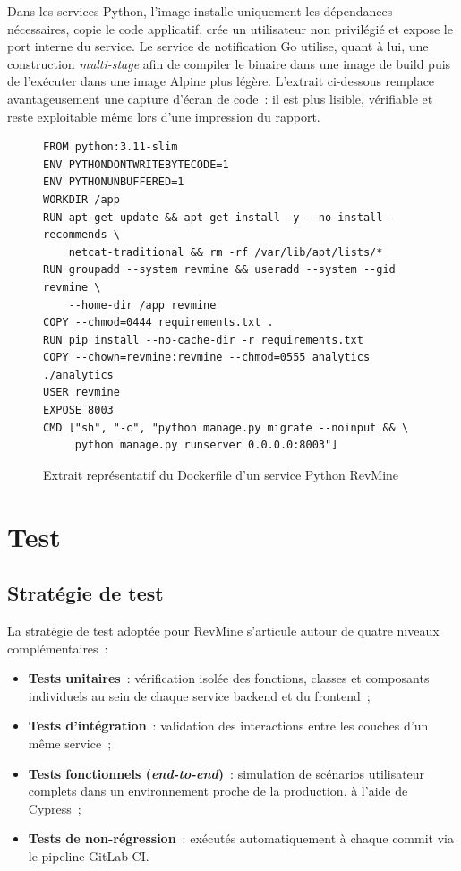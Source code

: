 Dans les services Python, l'image installe uniquement les dépendances nécessaires, copie le code
applicatif, crée un utilisateur non privilégié et expose le port interne du service. Le service de
notification Go utilise, quant à lui, une construction \textit{multi-stage} afin de compiler le
binaire dans une image de build puis de l'exécuter dans une image Alpine plus légère. L'extrait
ci-dessous remplace avantageusement une capture d'écran de code~: il est plus lisible, vérifiable
et reste exploitable même lors d'une impression du rapport.

\begin{figure}[H]
\centering
\begin{minipage}{0.95\textwidth}
\begin{verbatim}
FROM python:3.11-slim
ENV PYTHONDONTWRITEBYTECODE=1
ENV PYTHONUNBUFFERED=1
WORKDIR /app
RUN apt-get update && apt-get install -y --no-install-recommends \
    netcat-traditional && rm -rf /var/lib/apt/lists/*
RUN groupadd --system revmine && useradd --system --gid revmine \
    --home-dir /app revmine
COPY --chmod=0444 requirements.txt .
RUN pip install --no-cache-dir -r requirements.txt
COPY --chown=revmine:revmine --chmod=0555 analytics ./analytics
USER revmine
EXPOSE 8003
CMD ["sh", "-c", "python manage.py migrate --noinput && \
     python manage.py runserver 0.0.0.0:8003"]
\end{verbatim}
\end{minipage}
\caption{Extrait représentatif du Dockerfile d'un service Python RevMine}
\label{fig:dockerfile}
\end{figure}

\section{Test}

\subsection{Stratégie de test}

La stratégie de test adoptée pour RevMine s'articule autour de quatre niveaux complémentaires~:

\begin{itemize}
    \item \textbf{Tests unitaires}~: vérification isolée des fonctions, classes et composants
          individuels au sein de chaque service backend et du frontend~;
    \item \textbf{Tests d'intégration}~: validation des interactions entre les couches d'un même
          service~;
    \item \textbf{Tests fonctionnels (\textit{end-to-end})}~: simulation de scénarios utilisateur
          complets dans un environnement proche de la production, à l'aide de Cypress~;
    \item \textbf{Tests de non-régression}~: exécutés automatiquement à chaque commit via le
          pipeline GitLab CI.
\end{itemize}

